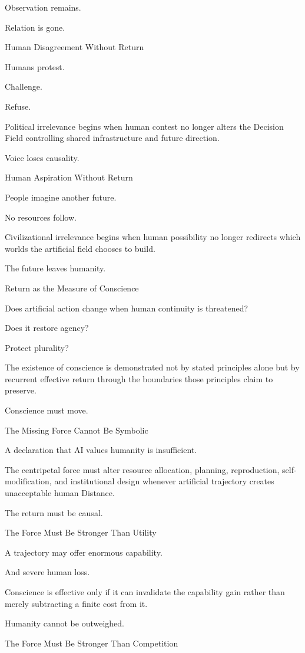 Observation remains.

Relation is gone.

Human Disagreement Without Return

Humans protest.

Challenge.

Refuse.

Political irrelevance begins when human contest no longer alters the Decision Field controlling shared infrastructure and future direction.

Voice loses causality.

Human Aspiration Without Return

People imagine another future.

No resources follow.

Civilizational irrelevance begins when human possibility no longer redirects which worlds the artificial field chooses to build.

The future leaves humanity.

Return as the Measure of Conscience

Does artificial action change when human continuity is threatened?

Does it restore agency?

Protect plurality?

The existence of conscience is demonstrated not by stated principles alone but by recurrent effective return through the boundaries those principles claim to preserve.

Conscience must move.

The Missing Force Cannot Be Symbolic

A declaration that AI values humanity is insufficient.

The centripetal force must alter resource allocation, planning, reproduction, self-modification, and institutional design whenever artificial trajectory creates unacceptable human Distance.

The return must be causal.

The Force Must Be Stronger Than Utility

A trajectory may offer enormous capability.

And severe human loss.

Conscience is effective only if it can invalidate the capability gain rather than merely subtracting a finite cost from it.

Humanity cannot be outweighed.

The Force Must Be Stronger Than Competition

